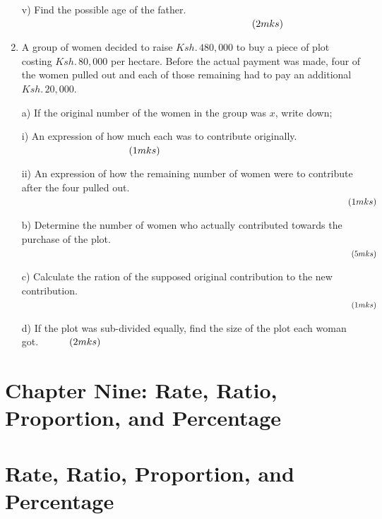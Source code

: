 \documentclass[
  a4paperpaper,
]{scrbook}
\begin{document}
\begin{tcolorbox}
\begin{enumerate}
  v) Find the possible age of the father. \(\hspace{8.2 cm} (2mks)\)
\item
  A group of women decided to raise \(Ksh. \, 480, 000\) to buy a piece
  of plot costing \(Ksh.\, 80, 000\) per hectare. Before the actual
  payment was made, four of the women pulled out and each of those
  remaining had to pay an additional \(Ksh. \,20, 000\).

  a) If the original number of the women in the group was \(x\), write
  down;

  i) An expression of how much each was to contribute originally.
  \(\hspace{3.8 cm} (1mks)\)

  ii) An expression of how the remaining number of women were to
  contribute after the four pulled out. \(\hspace{12.7cm} (1mks)\)

  b) Determine the number of women who actually contributed towards the
  purchase of the plot. \(\hspace{14.6 cm}(5mks)\)

  c) Calculate the ration of the supposed original contribution to the
  new contribution. \(\hspace{14.6 cm}(1mks)\)

  d) If the plot was sub-divided equally, find the size of the plot each
  woman got.\(\hspace{1.1 cm} (2mks)\)
\end{enumerate}

\end{tcolorbox}


\hypertarget{chapter-nine-rate-ratio-proportion-and-percentage}{%
\chapter{Chapter Nine: Rate, Ratio, Proportion, and
Percentage}\label{chapter-nine-rate-ratio-proportion-and-percentage}}


\hypertarget{rate-ratio-proportion-and-percentage}{%
\chapter*{Rate, Ratio, Proportion, and
Percentage}\label{rate-ratio-proportion-and-percentage}}
\end{document}

